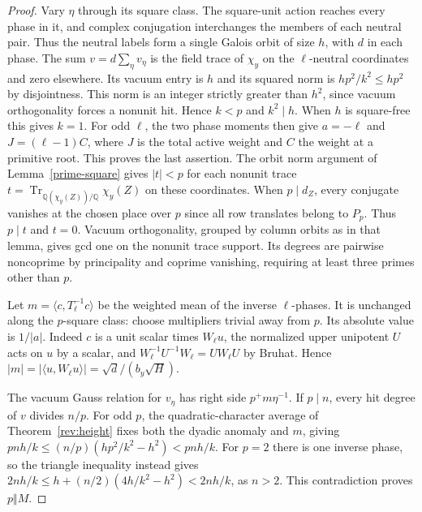\documentclass[11pt]{amsart}
\numberwithin{equation}{section}
\theoremstyle{definition}
\theoremstyle{plain}
\begin{document}
\begin{proof}
Vary $\eta$ through its square class. The square-unit action
reaches every phase in it, and complex conjugation interchanges
the members of each neutral pair. Thus the neutral labels form a
single Galois orbit of size $h$, with $d$ in each phase.
The sum $v=d\sum_\eta v_\eta$ is the field trace of $\chi_y$ on
the $\ell$-neutral coordinates and zero elsewhere. Its vacuum
entry is $h$ and its squared norm is $hp^2/k^2\le hp^2$ by disjointness. This norm is an integer strictly
greater than $h^2$, since vacuum orthogonality forces a nonunit hit.
Hence $k<p$ and $k^2\mid h$. When $h$ is square-free this gives
$k=1$. For odd $\ell$, the two phase moments then give $a=-\ell$
and $J=(\ell-1)C$, where $J$ is the total active weight and $C$
the weight at a primitive root. This proves the last assertion.
The orbit norm argument of Lemma~\ref{prime-square} gives
$|t|<p$ for each nonunit trace
$t=\operatorname{Tr}_{\mathbb Q(\chi_y(Z))/\mathbb Q}\chi_y(Z)$
on these coordinates. When $p\mid d_Z$, every conjugate vanishes
at the chosen place over $p$ since all row translates belong to
$P_p$. Thus $p\mid t$ and $t=0$. Vacuum orthogonality, grouped
by column orbits as in that lemma, gives gcd one on the nonunit
trace support. Its degrees are pairwise noncoprime by principality
and coprime vanishing, requiring at least three primes other than $p$.

Let $m=\langle c,T_\ell^{-1}c\rangle$ be the weighted mean of
the inverse $\ell$-phases. It is unchanged along the $p$-square
class: choose multipliers trivial away from $p$. Its absolute value
is $1/|a|$. Indeed $c$ is a unit scalar times $W_\ell u$, the
normalized upper unipotent $U$ acts on $u$ by a scalar, and
$W_\ell^{-1}U^{-1}W_\ell=UW_\ell U$ by Bruhat. Hence
$|m|=|\langle u,W_\ell u\rangle|=\sqrt d/(b_y\sqrt H)$.

The vacuum Gauss relation for $v_\eta$ has right side
$p^+m\eta^{-1}$. If $p\mid n$, every hit degree of $v$ divides
$n/p$. For odd $p$, the quadratic-character average of
Theorem~\ref{rev:height} fixes both the dyadic anomaly and $m$,
giving $pnh/k\le(n/p)(hp^2/k^2-h^2)<pnh/k$. For $p=2$ there
is one inverse phase, so the triangle inequality instead gives
$2nh/k\le h+(n/2)(4h/k^2-h^2)<2nh/k$, as $n>2$.
This contradiction proves $p\Vert M$.
\end{proof}

\end{document}
